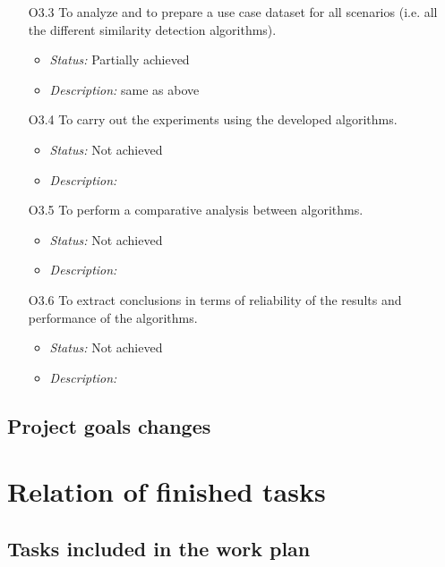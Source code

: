 \documentclass[11pt]{article}
\begin{document}
\begin{enumerate}
\begin{itemize}
\end{itemize}
\item[O3.3] To analyze and to prepare a use case dataset for all scenarios (i.e. all the different similarity detection algorithms).
\begin{itemize}
\item \textit{Status:} Partially achieved
\item \textit{Description:} same as above
\end{itemize}
\item[O3.4] To carry out the experiments using the developed algorithms.
\begin{itemize}
\item \textit{Status:} Not achieved
\item \textit{Description:} 
\end{itemize}
\item[O3.5] To perform a comparative analysis between algorithms.
\begin{itemize}
\item \textit{Status:} Not achieved
\item \textit{Description:} 
\end{itemize}
\item[O3.6] To extract conclusions in terms of reliability of the results and performance of the algorithms.
\begin{itemize}
\item \textit{Status:} Not achieved
\item \textit{Description:} 
\end{itemize}
\end{enumerate}

\subsection{Project goals changes}
\label{sec:goal_changes}



\section{Relation of finished tasks}
\label{sec:finished_tasks}



\subsection{Tasks included in the work plan}
\label{sec:tasks_work_plan}
\end{document}
